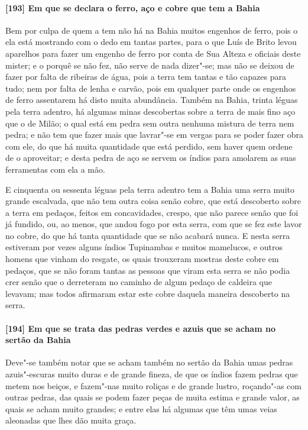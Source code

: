\paragraph{[193] Em que se declara o ferro, aço e cobre que tem a Bahia}\quad
Bem por culpa de quem a tem não há na Bahia muitos engenhos de ferro, pois o ela está
mostrando com o dedo em tantas partes, para o que Luís de Brito levou aparelhos para fazer
um engenho de ferro por conta de Sua Alteza e oficiais deste mister; e o porquê se não
fez, não serve de nada dizer"-se; mas não se deixou de fazer por falta de ribeiras de água,
pois a terra tem tantas e tão capazes para tudo; nem por falta de lenha e carvão, pois em
qualquer parte onde os engenhos de ferro assentarem há disto muita abundância. Também na
Bahia, trinta léguas pela terra adentro, há algumas minas descobertas sobre a terra de
mais fino aço que o de Milão; o qual está em pedra sem outra nenhuma mistura de terra nem
pedra; e não tem que fazer mais que lavrar"-se em vergas para se poder fazer obra com ele,
do que há muita quantidade que está perdido, sem haver quem ordene de o aproveitar; e
desta pedra de aço se servem os índios para amolarem as suas ferramentas com ela a mão.

E cinquenta ou sessenta léguas pela terra adentro tem a Bahia uma serra muito grande
escalvada, que não tem outra coisa senão cobre, que está descoberto sobre a terra em
pedaços, feitos em concavidades, crespo, que não parece senão que foi já fundido, ou, ao
menos, que andou fogo por esta serra, com que se fez este lavor no cobre, do que há tanta
quantidade que se não acabará nunca. E nesta serra estiveram por vezes alguns índios
Tupinambas e muitos mamelucos, e outros homens que vinham do resgate, os quais trouxeram
mostras deste cobre em pedaços, que se não foram tantas as pessoas que viram esta serra se
não podia crer senão que o derreteram no caminho de algum pedaço de caldeira que levavam;
mas todos afirmaram estar este cobre daquela maneira descoberto na serra.

\paragraph{[194] Em que se trata das pedras verdes e azuis que se acham no sertão da Bahia}\quad
Deve"-se também notar que se acham também no sertão da Bahia umas pedras azuis"-escuras
muito duras e de grande fineza, de que os índios fazem pedras que metem nos beiços, e
fazem"-nas muito roliças e de grande lustro, roçando"-as com outras pedras, das quais se
podem fazer peças de muita estima e grande valor, as quais se acham muito grandes; e entre
elas há algumas que têm umas veias aleonadas que lhes dão muita graça.

